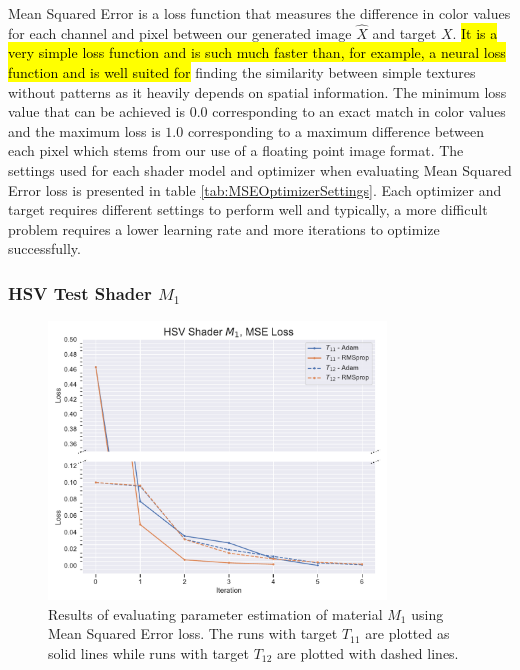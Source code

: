 Mean Squared Error is a loss function that measures the difference in color values for each channel and pixel between our generated image $\hat{X}$ and target $X$. \hl{It is a very simple loss function and is such much faster than, for example, a neural loss function and is well suited for} finding the similarity between simple textures without patterns as it heavily depends on spatial information. The minimum loss value that can be achieved is $0.0$ corresponding to an exact match in color values and the maximum loss is $1.0$ corresponding to a maximum difference between each pixel which stems from our use of a floating point image format. The settings used for each shader model and optimizer when evaluating Mean Squared Error loss is presented in table \ref{tab:MSEOptimizerSettings}. Each optimizer and target requires different settings to perform well and typically, a more difficult problem requires a lower learning rate and more iterations to optimize successfully.

\subsubsection{HSV Test Shader $M_1$}

\begin{figure}[ht]
    \centering
    \includegraphics[width=0.8\textwidth]{img/evaluation/M1/HSV_MSE.pdf}
    \caption{Results of evaluating parameter estimation of material $M_1$ using Mean Squared Error loss. The runs with target $T_{11}$ are plotted as solid lines while runs with target $T_{12}$ are plotted with dashed lines.}
    \label{fig:M1MSEData}
\end{figure}

